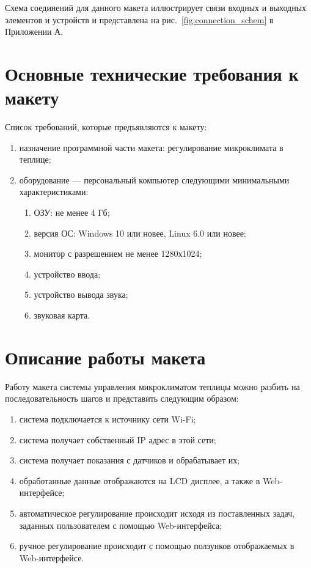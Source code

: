 
Схема соединений для данного макета иллюстрирует связи входных и выходных элементов и устройств и представлена на рис.~\ref{fig:connection_schem} в Приложении А.

\section{Основные технические требования к макету}

Список требований, которые предъявляются к макету:
\begin{enumerate}
    \item назначение программной части макета: регулирование микроклимата в теплице;
    \item оборудование --- персональный компьютер следующими минимальными характеристиками:
    \begin{enumerate}
        \item ОЗУ: не менее 4 Гб;
        \item версия ОС: Windows 10 или новее, Linux 6.0 или новее;
        \item монитор с разрешением не менее 1280х1024;
        \item устройство ввода;
        \item устройство вывода звука;
        \item звуковая карта.
    \end{enumerate}
\end{enumerate}

\section{Описание работы макета}

Работу макета системы управления микроклиматом теплицы можно разбить на последовательность шагов и представить следующим образом:

\begin{enumerate}
    \item система подключается к источнику сети Wi-Fi;
    \item система получает собственный IP адрес в этой сети;
    \item система получает показания с датчиков и обрабатывает их;
    \item обработанные данные отображаются на LCD дисплее, а также в Web-интерфейсе;
    \item автоматическое регулирование происходит исходя из поставленных задач, заданных пользователем с помощью Web-интерфейса;
    \item ручное регулирование происходит с помощью ползунков отображаемых в Web-интерфейсе. 
\end{enumerate}

